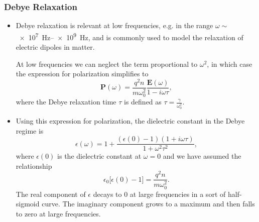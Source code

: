 \documentclass[11pt, a4paper]{article}
\renewcommand{\vec}[1]{\bm{#1}} %
\newcommand{\E}{\vec{E}} %
\renewcommand{\P}{\vec{P}}  %
\newcommand{\ee}{\epsilon_{0}}  %
\begin{document}
\subsubsection{Debye Relaxation}
\begin{itemize}
    \item Debye relaxation is relevant at low frequencies, e.g. in the range $ \omega \sim $ \SIrange{e7}{e9}{\hertz}, and is commonly used to model the relaxation of electric dipoles in matter.

    At low frequencies we can neglect the term proportional to $ \omega^{2} $, in which case the expression for polarization simplifies to
    \begin{equation*}
        \P(\omega) = \frac{q^{2}n}{m\omega_{0}^{2}} \frac{\E(\omega)}{1 - i\omega\tau},
    \end{equation*}
    where the Debye relaxation time $ \tau $ is defined as $ \tau = \frac{\gamma}{\omega_{0}^{2}} $.
    
    \item Using this expression for polarization, the dielectric constant in the Debye regime is
    \begin{equation*}
        \epsilon(\omega) = 1 + \frac{(\epsilon(0) -1)(1 + i\omega\tau)}{1 + \omega^{2}\tau^{2}},
    \end{equation*}
    where $ \epsilon(0) $ is the dielectric constant at $ \omega = 0 $ and we have assumed the relationship
    \begin{equation*}
        \ee \big[ \epsilon(0) -1 \big] = \frac{q^{2}n}{m\omega_{0}^{2}}.
    \end{equation*}
    The real component of $ \epsilon $ decays to 0 at large frequencies in a sort of half-sigmoid curve. The imaginary component grows to a maximum and then falls to zero at large frequencies.
\end{itemize}
\end{document}
